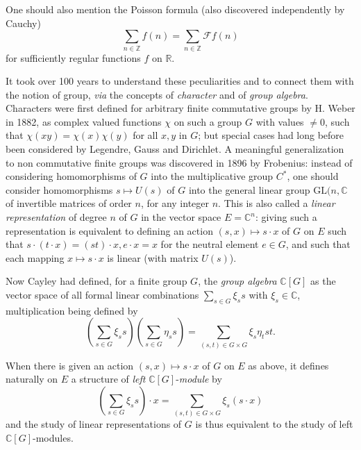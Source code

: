 \documentclass[12pt,a4paper,leqno,twoside]{extbook}
\newcommand{\C}{\mathbb{C}}
\newcommand{\R}{\mathbb{R}}
\begin{document}
One should also mention the Poisson formula (also discovered independently by Cauchy)
\begin{equation}
    \label{eq:7.45}
    \sum_{n \in \mathbb{Z}} f(n) = \sum_{n \in \mathbb{Z}} \mathcal{F}f(n)
\end{equation}
for sufficiently regular functions \(f\) on \(\R\).

It took over 100 years to understand these peculiarities and to connect them with the notion of group, \emph{via} the concepts of \emph{character} and of \emph{group algebra}. Characters were first defined for arbitrary finite commutative groups by H. Weber in 1882, as complex valued functions \(\chi\) on such a group \(G\) with values \(\neq 0\), such that \(\chi(xy) = \chi(x)\chi(y)\) for all \(x, y\) in \(G\); but special cases had long before been considered by Legendre, Gauss and Dirichlet. A meaningful generalization to non commutative finite groups was discovered in 1896 by Frobenius: instead of considering homomorphisms of \(G\) into the multiplicative group \(C^*\), one should consider homomorphisms \(s \mapsto U(s)\) of \(G\) into the general linear group \(\text{GL}(n,\C\) of invertible matrices of order \(n\), for any integer \(n\). This is also called a \emph{linear representation} of degree \(n\) of \(G\) in the vector space \(E = \C^n\): giving such a representation is equivalent to defining an action \((s,x) \mapsto s \cdot x\) of \(G\) on \(E\) such that \(s \cdot (t \cdot x) = (st) \cdot x, e \cdot x = x\) for the neutral element \(e \in G\), and such that each mapping \(x \mapsto s \cdot x\) is linear (with matrix \(U(s)\)).

Now Cayley had defined, for a finite group \(G\), the \emph{group algebra} \(\C[G]\) as the vector space of all formal linear combinations \(\sum\limits_{s \in G} \xi_s s\) with \(\xi_s \in \C\), multiplication being defined by
\begin{equation}
    \label{eq:7.46}
    \left( \sum_{s \in G} \xi_s s \right) \left( \sum_{s \in G} \eta_s s \right)
    =
    \sum_{(s,t) \in G \times G} \xi_s \eta_t st.
\end{equation}

When there is given an action \((s,x) \mapsto s \cdot x\) of \(G\) on \(E\) as above, it defines naturally on \(E\) a structure of \emph{left} \(\C[G]\)-\emph{module} by
\begin{equation}
    \label{eq:7.47}
    \left( \sum_{s \in G} \xi_s s \right) \cdot x
    =
    \sum_{(s,t) \in G \times G} \xi_s (s \cdot x)
\end{equation}
and the study of linear representations of \(G\) is thus equivalent to the study of left \(\C[G]\)-modules.
\end{document}
